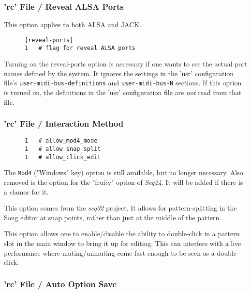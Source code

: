 \subsubsection{'rc' File / Reveal ALSA Ports}
\label{subsubsec:configuration_rc_reveal_ports}

   This option applies to both ALSA and JACK.

   \begin{verbatim}
      [reveal-ports]
      1   # flag for reveal ALSA ports
   \end{verbatim}

   Turning on the reveal-ports option is necessary if one
   wants to see the actual port names defined by the system.
   It ignores the settings in the 'usr' configuration file's
   \texttt{user-midi-bus-definitions} and \texttt{user-midi-bus-N} sections.
   If this option is turned on, the definitions in the
   'usr' configuration file are \textsl{not} read from that file.

\subsubsection{'rc' File / Interaction Method}
\label{subsubsec:configuration_rc_interaction}

   \begin{verbatim}
      1   # allow_mod4_mode
      1   # allow_snap_split
      1   # allow_click_edit
   \end{verbatim}

   The \texttt{Mod4} ("Windows" key) option is still available, but no longer
   necessary.  Also removed is the option for the "fruity" option
   of \textsl{Seq24}.
   It will be added if there is a clamor for it.

   This option comes from the \textsl{seq32} project.  It allows for
   pattern-splitting in the Song editor at snap points, rather than just
   at the middle of the pattern.

   This option allows one to enable/disable the ability to double-click
   in a pattern slot in the main window to bring it up for editing.
   This can interfere with a live performance where muting/unmuting come fast
   enough to be seen as a double-click.

\subsubsection{'rc' File / Auto Option Save}
\label{subsubsec:configuration_rc_auto_option_save}

